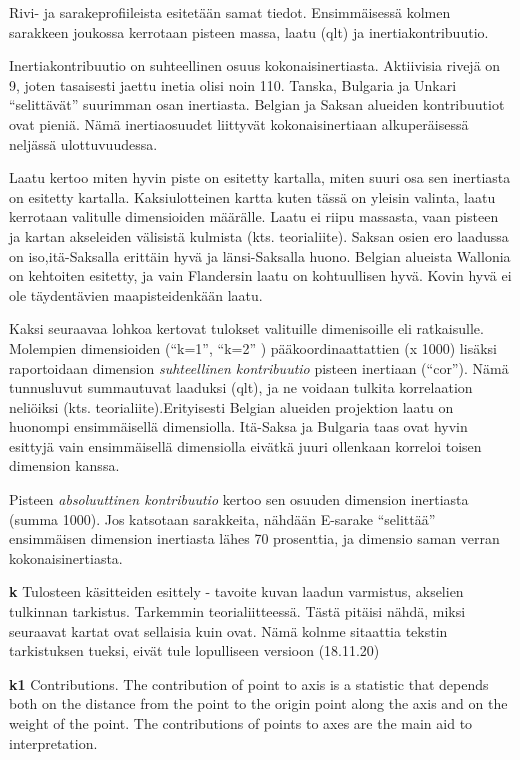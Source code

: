 \documentclass[
  finnish,
]{book}
\begin{document}
Rivi- ja sarakeprofiileista esitetään samat tiedot. Ensimmäisessä kolmen
sarakkeen joukossa kerrotaan pisteen massa, laatu (qlt) ja inertiakontribuutio.

Inertiakontribuutio on suhteellinen osuus kokonaisinertiasta. Aktiivisia rivejä on 9,
joten tasaisesti jaettu inetia olisi noin 110. Tanska, Bulgaria ja Unkari ``selittävät''
suurimman osan inertiasta. Belgian ja Saksan alueiden kontribuutiot ovat pieniä.
Nämä inertiaosuudet liittyvät kokonaisinertiaan alkuperäisessä neljässä ulottuvuudessa.

Laatu kertoo miten hyvin piste on esitetty kartalla, miten suuri osa sen
inertiasta on esitetty kartalla. Kaksiulotteinen kartta kuten tässä on yleisin
valinta, laatu kerrotaan valitulle dimensioiden määrälle. Laatu ei riipu massasta,
vaan pisteen ja kartan akseleiden välisistä kulmista (kts. teorialiite). Saksan
osien ero laadussa on iso,itä-Saksalla erittäin hyvä ja länsi-Saksalla huono.
Belgian alueista Wallonia on kehtoiten esitetty, ja vain Flandersin laatu on
kohtuullisen hyvä. Kovin hyvä ei ole täydentävien maapisteidenkään laatu.

Kaksi seuraavaa lohkoa kertovat tulokset valituille dimenisoille eli ratkaisulle.
Molempien dimensioiden (``k=1'', ``k=2'' ) pääkoordinaattattien (x 1000) lisäksi
raportoidaan dimension \emph{suhteellinen kontribuutio} pisteen inertiaan (``cor'').
Nämä tunnusluvut summautuvat laaduksi (qlt), ja ne voidaan tulkita korrelaation
neliöiksi (kts. teorialiite).Erityisesti Belgian alueiden projektion laatu on
huonompi ensimmäisellä dimensiolla. Itä-Saksa ja Bulgaria taas ovat hyvin esittyjä
vain ensimmäisellä dimensiolla eivätkä juuri ollenkaan korreloi toisen dimension
kanssa.

Pisteen \emph{absoluuttinen kontribuutio} kertoo sen osuuden dimension inertiasta
(summa 1000). Jos katsotaan sarakkeita, nähdään E-sarake ``selittää'' ensimmäisen
dimension inertiasta lähes 70 prosenttia, ja dimensio saman verran
kokonaisinertiasta.

\textbf{k} Tulosteen käsitteiden esittely - tavoite kuvan laadun varmistus, akselien
tulkinnan tarkistus. Tarkemmin teorialiitteessä. Tästä pitäisi nähdä, miksi seuraavat
kartat ovat sellaisia kuin ovat. Nämä kolnme sitaattia tekstin tarkistuksen tueksi,
eivät tule lopulliseen versioon (18.11.20)

\textbf{k1} Contributions. The contribution of point to axis is a statistic that depends
both on the distance from the point to the origin point along the axis and on
the weight of the point. The contributions of points to axes are the main aid to
interpretation.
\end{document}
